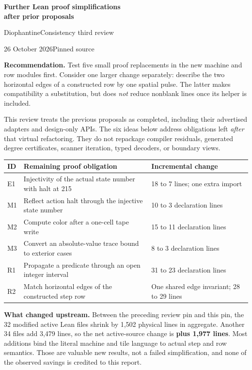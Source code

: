 {\LARGE\bfseries Further Lean proof simplifications\\after prior proposals\par}
\vspace{6pt}
{\large DiophantineConsistency third review\par}
\vspace{7pt}
26 October 2026\qquad Pinned source 

\textbf{Recommendation.} Test five small proof replacements in the new machine and row modules first. Consider one larger change separately: describe the two horizontal edges of a constructed row by one spatial pulse. The latter makes compatibility a substitution, but does \emph{not} reduce nonblank lines once its helper is included.

This review treats the previous proposals as completed, including their advertised adapters and design-only APIs. The six ideas below address obligations left \emph{after} that virtual refactoring. They do not repackage compiler residuals, generated degree certificates, scanner iteration, typed decoders, or boundary views.

\begin{tabularx}{\linewidth}{@{}L{0.39in}Y L{1.55in}@{}}
\toprule
ID & Remaining proof obligation & Incremental change \\
\midrule
E1 & Injectivity of the actual state number with halt at 215 & 18 to 7 lines; one extra import \\
M1 & Reflect action halt through the injective state number & 10 to 3 declaration lines \\
M2 & Compute color after a one-cell tape write & 15 to 11 declaration lines \\
M3 & Convert an absolute-value trace bound to exterior cases & 8 to 3 declaration lines \\
R1 & Propagate a predicate through an open integer interval & 31 to 23 declaration lines \\
R2 & Match horizontal edges of the constructed step row & One shared edge invariant; 28 to 29 lines \\
\bottomrule
\end{tabularx}

\textbf{What changed upstream.} Between the preceding review pin and this pin, the 32 modified active Lean files shrink by 1,502 physical lines in aggregate. Another 34 files add 3,479 lines, so the net active-source change is \textbf{plus 1,977 lines}. Most additions bind the literal machine and tile language to actual step and row semantics. Those are valuable new results, not a failed simplification, and none of the observed savings is credited to this report.

